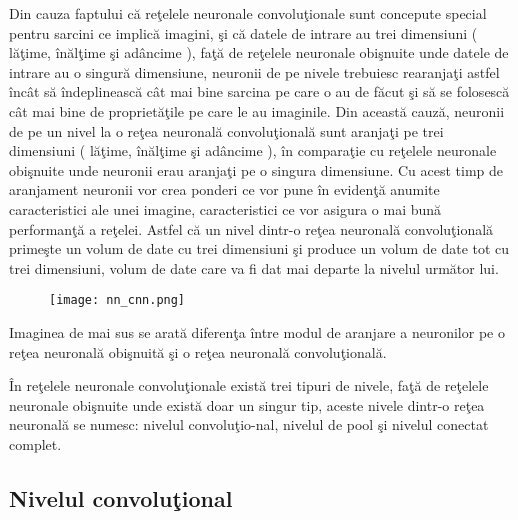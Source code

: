 \par

Din cauza faptului c\u{a} re\c{t}elele neuronale convolu\c{t}ionale sunt concepute special pentru sarcini ce implic\u{a} imagini, \c{s}i c\u{a} datele de intrare  au trei dimensiuni ( l\u{a}\c{t}ime, \^{i}n\u{a}l\c{t}ime \c{s}i ad\^{a}ncime ),  fa\c{t}\u{a} de re\c{t}elele neuronale obi\c{s}nuite unde datele de intrare au o singur\u{a} dimensiune, neuronii de pe nivele trebuiesc rearanja\c{t}i astfel \^{i}nc\^{a}t s\u{a} \^{i}ndeplineasc\u{a} c\^{a}t mai bine sarcina pe care o au de f\u{a}cut \c{s}i s\u{a} se folosesc\u{a} c\^{a}t mai bine de propriet\u{a}\c{t}ile pe care le au imaginile. Din aceast\u{a} cauz\u{a}, neuronii de pe un nivel la o re\c{t}ea neuronal\u{a} convolu\c{t}ional\u{a} sunt aranja\c{t}i pe trei dimensiuni ( l\u{a}\c{t}ime, \^{i}n\u{a}l\c{t}ime \c{s}i ad\^{a}ncime ), \^{i}n compara\c{t}ie cu re\c{t}elele neuronale obi\c{s}nuite unde neuronii erau aranja\c{t}i pe o singura dimensiune. Cu acest timp de aranjament neuronii vor crea ponderi ce vor pune \^{i}n eviden\c{t}\u{a} anumite caracteristici ale unei imagine, caracteristici ce vor asigura o mai bun\u{a} performan\c{t}\u{a} a re\c{t}elei. Astfel c\u{a} un nivel dintr-o re\c{t}ea neuronal\u{a} convolu\c{t}ional\u{a} prime\c{s}te un volum de date cu trei dimensiuni \c{s}i produce un volum de date tot cu trei dimensiuni, volum de date care va fi dat mai departe la nivelul urm\u{a}tor lui.

\par 

\begin{figure}[h!]
  \centering
  \texttt{[image: nn\_cnn.png]}
\end{figure}

Imaginea de mai sus se arat\u{a} diferen\c{t}a \^{i}ntre modul de aranjare a neuronilor pe o re\c{t}ea neuronal\u{a} obi\c{s}nuit\u{a} \c{s}i o re\c{t}ea neuronal\u{a} convolu\c{t}ional\u{a}.

\^{I}n re\c{t}elele neuronale convolu\c{t}ionale exist\u{a} trei tipuri de nivele, fa\c{t}\u{a} de re\c{t}elele neuronale obi\c{s}nuite unde exist\u{a} doar un singur tip, aceste nivele dintr-o re\c{t}ea neuronal\u{a} se numesc: nivelul convolu\c{t}io-nal, nivelul de pool \c{s}i nivelul conectat complet.

\subsection{Nivelul convolu\c{t}ional}


